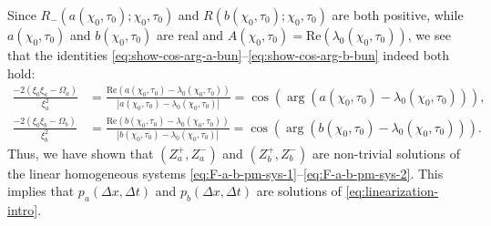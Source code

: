 Since $R_-(a(\chi_0,\tau_0);\chi_0,\tau_0)$ and $R(b(\chi_0,\tau_0);\chi_0,\tau_0)$ are both positive, while $a(\chi_0,\tau_0)$ and $b(\chi_0,\tau_0)$ are real and $A(\chi_0,\tau_0)=\mathrm{Re}(\lambda_0(\chi_0,\tau_0))$, 
we see that the identities \eqref{eq:show-cos-arg-a-bun}--\eqref{eq:show-cos-arg-b-bun} indeed both hold:
\begin{align}
\frac{-2(\xi_0\xi_a - \Omega_a)}{\xi_a^2}&=\frac{\mathrm{Re}(a(\chi_0,\tau_0)-\lambda_0(\chi_0,\tau_0))}{|a(\chi_0,\tau_0)-\lambda_0(\chi_0,\tau_0)|}=\cos(\arg(a(\chi_0,\tau_0)-\lambda_0(\chi_0,\tau_0))),\\
\frac{-2(\xi_0\xi_b - \Omega_b)}{\xi_b^2}&=\frac{\mathrm{Re}(b(\chi_0,\tau_0)-\lambda_0(\chi_0,\tau_0))}{|b(\chi_0,\tau_0)-\lambda_0(\chi_0,\tau_0)|}=\cos(\arg(b(\chi_0,\tau_0)-\lambda_0(\chi_0,\tau_0))).
\end{align}
Thus, we have shown that $(Z_a^+,Z_a^-)$ and $(Z_b^+,Z_b^-)$ are non-trivial solutions of the linear homogeneous systems \eqref{eq:F-a-b-pm-sys-1}--\eqref{eq:F-a-b-pm-sys-2}.
This implies that  $p_a(\Delta x, \Delta t)$ and  $p_b(\Delta x, \Delta t)$ are solutions of \eqref{eq:linearization-intro}.
